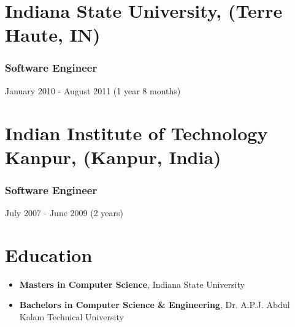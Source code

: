 \documentclass[letterpaper,9pt]{article}
\begin{document}
    
    \section{Indiana State University, (Terre Haute, IN)}
    \subsubsection{Software Engineer}{January 2010 - August 2011 (1 year 8 months)}

    
    \section{Indian Institute of Technology Kanpur, (Kanpur, India)}
    \subsubsection{Software Engineer}{July 2007 - June 2009 (2 years)}
    

    \section{Education}
    \begin{itemize}
    	\item \textbf{\color{black}Masters in Computer Science}, Indiana State University
    	\item \textbf{\color{black}Bachelors in Computer Science \& Engineering}, Dr. A.P.J. Abdul Kalam Technical University
    \end{itemize}


    
\end{document}
